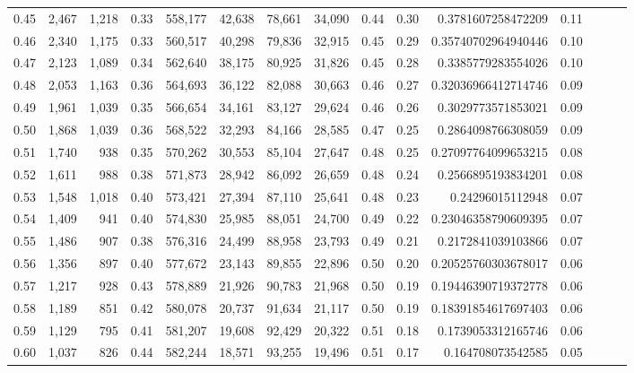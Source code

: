 \begin{tabular}{rrrrrrrrrrrrrrr}
0.45 &   2,467 &  1,218 &  0.33 &  558,177 &   42,638 &   78,661 &   34,090 &  0.44 &  0.30 &    0.3781607258472209 &      0.11 \\
0.46 &   2,340 &  1,175 &  0.33 &  560,517 &   40,298 &   79,836 &   32,915 &  0.45 &  0.29 &   0.35740702964940446 &      0.10 \\
0.47 &   2,123 &  1,089 &  0.34 &  562,640 &   38,175 &   80,925 &   31,826 &  0.45 &  0.28 &    0.3385779283554026 &      0.10 \\
0.48 &   2,053 &  1,163 &  0.36 &  564,693 &   36,122 &   82,088 &   30,663 &  0.46 &  0.27 &   0.32036966412714746 &      0.09 \\
0.49 &   1,961 &  1,039 &  0.35 &  566,654 &   34,161 &   83,127 &   29,624 &  0.46 &  0.26 &    0.3029773571853021 &      0.09 \\
0.50 &   1,868 &  1,039 &  0.36 &  568,522 &   32,293 &   84,166 &   28,585 &  0.47 &  0.25 &    0.2864098766308059 &      0.09 \\
0.51 &   1,740 &    938 &  0.35 &  570,262 &   30,553 &   85,104 &   27,647 &  0.48 &  0.25 &   0.27097764099653215 &      0.08 \\
0.52 &   1,611 &    988 &  0.38 &  571,873 &   28,942 &   86,092 &   26,659 &  0.48 &  0.24 &    0.2566895193834201 &      0.08 \\
0.53 &   1,548 &  1,018 &  0.40 &  573,421 &   27,394 &   87,110 &   25,641 &  0.48 &  0.23 &      0.24296015112948 &      0.07 \\
0.54 &   1,409 &    941 &  0.40 &  574,830 &   25,985 &   88,051 &   24,700 &  0.49 &  0.22 &   0.23046358790609395 &      0.07 \\
0.55 &   1,486 &    907 &  0.38 &  576,316 &   24,499 &   88,958 &   23,793 &  0.49 &  0.21 &    0.2172841039103866 &      0.07 \\
0.56 &   1,356 &    897 &  0.40 &  577,672 &   23,143 &   89,855 &   22,896 &  0.50 &  0.20 &   0.20525760303678017 &      0.06 \\
0.57 &   1,217 &    928 &  0.43 &  578,889 &   21,926 &   90,783 &   21,968 &  0.50 &  0.19 &   0.19446390719372778 &      0.06 \\
0.58 &   1,189 &    851 &  0.42 &  580,078 &   20,737 &   91,634 &   21,117 &  0.50 &  0.19 &   0.18391854617697403 &      0.06 \\
0.59 &   1,129 &    795 &  0.41 &  581,207 &   19,608 &   92,429 &   20,322 &  0.51 &  0.18 &    0.1739053312165746 &      0.06 \\
0.60 &   1,037 &    826 &  0.44 &  582,244 &   18,571 &   93,255 &   19,496 &  0.51 &  0.17 &     0.164708073542585 &      0.05 \\

\end{tabular}
